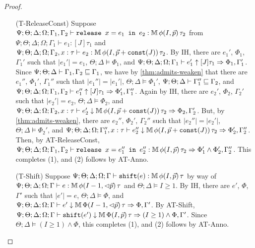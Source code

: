 \begin{proof}
\begin{itemize}
  \item[(T-ReleaseConst)] Suppose
  $\Psi ; \Theta ; \Delta ; \Omega ; \Gamma_1,\Gamma_2 \vdash \texttt{release } x = e_1 \texttt{ in }e_2 : \mathbb{M} \, \phi(I,\vec{p}) \, \tau_2$ from
  $\Psi ; \Theta ; \Delta ; \Omega ; \Gamma_1 \vdash e_1 : [J] \tau_1$ and
  $\Psi ; \Theta ; \Delta ; \Omega ; \Gamma_2, x : \tau \vdash e_2 : \mathbb{M} \, \phi(I,\vec{p} + \texttt{const}(J)) \, \tau_2$.
  By IH, there are $e_1'$, $\Phi_1$, $\Gamma_1'$ such that
  $|e_1'| = e_1$,
  $\Theta ; \Delta \vDash \Phi_1$, and
  $\Psi ; \Theta ; \Delta ; \Omega ; \Gamma_1 \vdash e_1' \uparrow [J] \tau_1 \Rightarrow \Phi_1,\Gamma_1'$.
  Since $\Psi ; \Theta ; \Delta \vdash \Gamma_1,\Gamma_2 \sqsubseteq \Gamma_1$, we have by \autoref{thm:admits-weaken}
  that there are $e_1''$, $\Phi_1'$, $\Gamma_1''$ such that
  $|e_1''| = |e_1'|$,
  $\Theta ; \Delta \vDash \Phi_1'$,
  $\Psi ; \Theta ; \Delta \vdash \Gamma_1'' \sqsubseteq \Gamma_2$, and
  $\Psi ; \Theta ; \Delta ; \Omega; \Gamma_1,\Gamma_2 \vdash e_1'' \uparrow [J] \tau_1 \Rightarrow \Phi_1',\Gamma_1''$.
  Again by IH, there are $e_2'$, $\Phi_2$, $\Gamma_2'$ such that
  $|e_2'| = e_2$,
  $\Theta ; \Delta \vDash \Phi_2$, and
  $\Psi ; \Theta ; \Delta ; \Omega ; \Gamma_2, x : \tau \vdash e_2' \downarrow \mathbb{M} \, \phi(I,\vec{p} + \texttt{const}(J)) \, \tau_2 \Rightarrow \Phi_2,\Gamma_2'$.
  But, by \autoref{thm:admits-weaken}, there are $e_2''$, $\Phi_2'$, $\Gamma_2''$ such that
  $|e_2''| = |e_2'|$,
  $\Theta ; \Delta \vDash \Phi_2'$, and
  $\Psi ; \Theta ; \Delta ; \Omega ; \Gamma_1'', x: \tau \vdash e_2'' \downarrow  \mathbb{M} \, \phi(I,\vec{p} + \texttt{const}(J)) \, \tau_2 \Rightarrow \Phi_2',\Gamma_2''$.
  Then, by AT-ReleaseConst, 
  $\Psi ; \Theta ; \Delta ; \Omega ; \Gamma_1,\Gamma_2 \vdash \texttt{release } x = e_1'' \texttt{ in }e_2'' : \mathbb{M} \, \phi(I,\vec{p}) \, \tau_2 \Rightarrow \Phi_1' \wedge \Phi_2',\Gamma_2''$.
  This completes (1), and (2) follows by AT-Anno.
  
  \item[(T-Shift)] Suppose $\Psi ; \Theta ; \Delta ; \Omega ; \Gamma \vdash \texttt{shift}(e) : \mathbb{M} \, \phi(I,\vec{p}) \, \tau$ by way of
  $\Psi ; \Theta ; \Delta ; \Omega ; \Gamma \vdash e : \mathbb{M} \, \phi(I - 1,\lhd \vec{p}) \, \tau$ and
  $\Theta ; \Delta \vDash I \geq 1$.
  By IH, there are $e'$, $\Phi$, $\Gamma'$ such that
  $|e'| = e$,
  $\Theta ; \Delta \vDash \Phi$, and
  $\Psi  ; \Theta ; \Delta ; \Omega; \Gamma \vdash e' \downarrow \mathbb{M} \, \Phi(I-1,\lhd \vec{p}) \, \tau \Rightarrow \Phi,\Gamma'$.
  By AT-Shift,
  $\Psi  ; \Theta ; \Delta ; \Omega; \Gamma \vdash \texttt{shift}(e') \downarrow \mathbb{M} \, \Phi(I,\vec{p}) \, \tau \Rightarrow (I \geq 1) \wedge \Phi,\Gamma'$.
  Since $\Theta ; \Delta \vDash (I \geq 1) \wedge \Phi$, this completes (1), and (2) follows by AT-Anno.


\end{itemize}
\end{proof}
